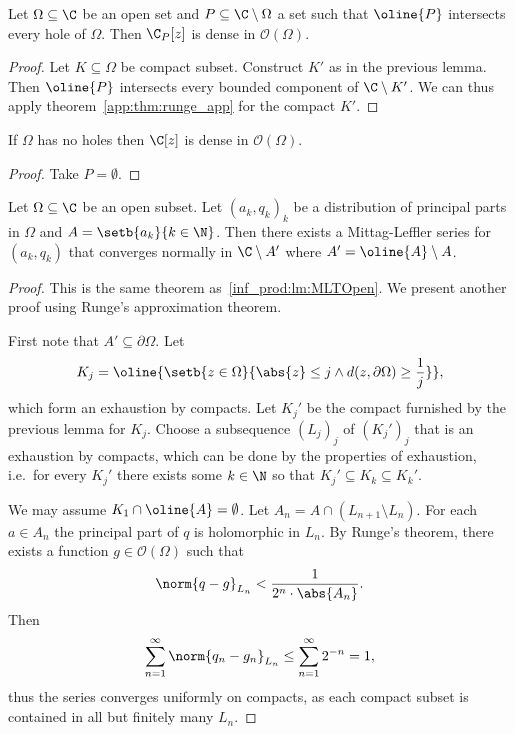 \begin{izrek}
Let $\Omega \subseteq \C$ be an open set and
$P \subseteq \C \setminus \Omega$ a set such that $\oline{P}$
intersects every hole of $\Omega$. Then $\C_P[z]$ is dense in
$\mathcal{O}(\Omega)$.
\end{izrek}

\begin{proof}
Let $K \subseteq \Omega$ be compact subset. Construct $K'$ as in
the previous lemma. Then $\oline{P}$ intersects every bounded
component of $\C \setminus K'$. We can thus apply
theorem~\ref{app:thm:runge_app} for the compact $K'$.
\end{proof}

\begin{posledica}
If $\Omega$ has no holes then $\C[z]$ is dense in
$\mathcal{O}(\Omega)$.
\end{posledica}

\begin{proof}
Take $P = \emptyset$.
\end{proof}

\begin{izrek}
Let $\Omega \subseteq \C$ be an open subset. Let $(a_k, q_k)_k$ be
a distribution of principal parts in $\Omega$ and
$A = \setb{a_k}{k \in \N}$. Then there exists a Mittag-Leffler
series for $(a_k, q_k)$ that converges normally in
$\C \setminus A'$ where $A' = \oline{A} \setminus A$.
\end{izrek}

\begin{proof}
This is the same theorem as~\ref{inf_prod:lm:MLTOpen}. We present
another proof using Runge's approximation theorem.

First note that $A' \subseteq \partial \Omega$. Let 
\[
K_j =
\oline{\setb{z \in \Omega}
{\abs{z} \leq j \land d(z, \partial \Omega) \geq \frac{1}{j}}},
\]
which form an exhaustion by compacts. Let $K_j'$ be the compact
furnished by the previous lemma for $K_j$. Choose a subsequence
$(L_j)_j$ of $(K_j')_j$ that is an exhaustion by compacts, which
can be done by the properties of exhaustion, i.e.~for every $K_j'$
there exists some $k \in \N$ so that
$K_j' \subseteq K_k \subseteq K_k'$.

We may assume $K_1 \cap \oline{A} = \emptyset$. Let
$A_n = A \cap (L_{n + 1} \setminus L_n)$. For each $a \in A_n$ the
principal part of $q$ is holomorphic in $L_n$. By Runge's theorem,
there exists a function $g \in \mathcal{O}(\Omega)$ such that
\[
\norm{q - g}_{L_n} < \frac{1}{2^n \cdot \abs{A_n}}.
\]
Then
\[
\sum_{n=1}^\infty \norm{q_n - g_n}_{L_n} \leq
\sum_{n=1}^\infty 2^{-n} = 1,
\]
thus the series converges uniformly on compacts, as each compact
subset is contained in all but finitely many $L_n$.
\end{proof}

